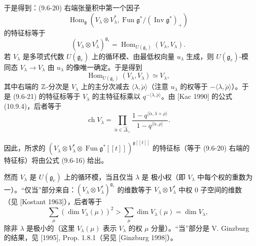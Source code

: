 于是得到：(9.6-20) 右端张量积中第一个因子
\begin{equation}
    \operatorname{Hom}_{\mathfrak{g}}\left(V_\lambda\otimes V_\lambda^*,
        \operatorname{Fun}\mathfrak{g}^*/(\operatorname{Inv}\mathfrak{g}^*)_+\right)
    \tag{9.6-21}
\end{equation}
的特征标等于
\[
    (V_\lambda\otimes V_\lambda^*)^{\mathfrak{g}_e}
    =\operatorname{Hom}_{U(\mathfrak{g}_e)}(V_\lambda,V_\lambda).
\]
若 $V_\lambda$ 是多项式代数 $U(\mathfrak{g}_e)$ 上的循环模、由最低权向量 $u_\lambda$ 生成，则 $U(\mathfrak{g}_e)$-模同态 $V_\lambda\to V_\lambda$ 由 $u_\lambda$ 的像唯一确定。于是得到
\[
    \operatorname{Hom}_{U(\mathfrak{g}_e)}(V_\lambda,V_\lambda)\simeq V_\lambda,
\]
其中右端的 $\mathbb{Z}$-分次是 $V_\lambda$ 上的主分次减去 $\langle\lambda,\check\rho\rangle$（注意 $u_\lambda$ 的权等于 $-\langle\lambda,\check\rho\rangle$）。于是 (9.6-21) 的特征标等于 $V_\lambda$ 的主特征标乘以 $q^{-\langle\lambda,\check\rho\rangle}$。由 [Kac 1990] 的公式 (10.9.4)，后者等于
\begin{equation}
    \operatorname{ch}V_\lambda
    =\prod_{\check\alpha\in\hat\Delta_+}\frac{1-q^{\langle\check\alpha,\lambda+\rho\rangle}}{1-q^{\langle\check\alpha,\rho\rangle}}.
    \tag{9.6-22}
\end{equation}


因此，所求的 $\left(V_\lambda\otimes V_\lambda^*\otimes\operatorname{Fun}\mathfrak{g}^*[[t]]\right)^{\mathfrak{g}[[t]]}$ 的特征标（等于 (9.6-20) 右端的特征标）将由公式 (9.6-16) 给出。

然而 $V_\lambda$ 是 $U(\mathfrak{g}_e)$ 上的循环模，当且仅当 $\lambda$ 是 极小权（即 $V_\lambda$ 中每个权的重数为一）。“仅当”部分来自：$(V_\lambda\otimes V_\lambda^*)^{\mathfrak{g}_e}$ 的维数等于 $V_\lambda\otimes V_\lambda^*$ 中权 0 子空间的维数（见 [Kostant 1963]），后者等于
\[
    \sum_\mu\left(\dim V_\lambda(\mu)\right)^2>\sum_\mu\dim V_\lambda(\mu)=\dim V_\lambda,
\]
除非 $\lambda$ 是极小的（这里 $V_\lambda(\mu)$ 表示 $V_\lambda$ 的权 $\mu$ 分量）。“当”部分是 V. Ginzburg 的结果，见 [1995], Prop. 1.8.1（另见 [Ginzburg 1998]）。

